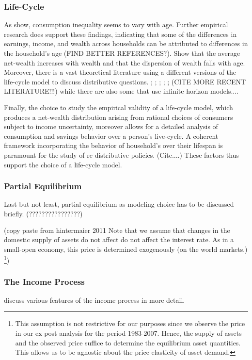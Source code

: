 \documentclass[a4paper,12pt]{article}
\begin{document}
\subsubsection{Life-Cycle}

As \cite{deaton1994} show, consumption inequality seems to vary with age. Further empirical research does support these findings, indicating that some of the differences in earnings, income, and wealth across households can be attributed to differences in the household's age \cite{rios2016} (FIND BETTER REFERENCES?). \cite{hintermaier2011} Show that the average net-wealth increases with wealth and that the dispersion of wealth falls with age. 
Moreover, there is a vast theoretical literature using a different versions of the life-cycle model to discuss distributive questions.  \cite{Gourinchas&Parker2002}; \cite{cagetti2003}; \cite{castaneda2003}; \cite{yang2009}; \cite{kaplan2010};\cite{hintermaier2011} (CITE MORE RECENT LITERATURE!!!)
while there are also some that use infinite horizon models....

Finally, the choice to study the empirical validity of a life-cycle model, which produces a net-wealth distribution arising from rational choices of consumers subject to income uncertainty, moreover allows for a detailed analysis of consumption and savings behavior over a person's live-cycle. A coherent framework incorporating the behavior of household's over their lifespan is paramount for the study of re-distributive policies. (Cite....)
These factors thus support the choice of a life-cycle model. 


\subsubsection{Partial Equilibrium}
Last but not least, partial equilibrium as modeling choice has to be discussed briefly. (????????????????)

(copy paste from hintermaier 2011
Note that we assume that changes in the domestic supply of assets do not affect do not affect the interest rate. As in a small-open economy, this price is determined exogenously (on the world markets.) \footnote{This assumption is not restrictive for our purposes since we observe the price in our ex post analysis for the period 1983-2007. Hence, the supply of assets and the observed price suffice to determine the equilibrium asset quantities. This allows us to be agnostic about the price elasticity of asset demand.})

\subsubsection{The Income Process}
\cite{kaplan2010} discuss various features of the income process in more detail.
\end{document}
